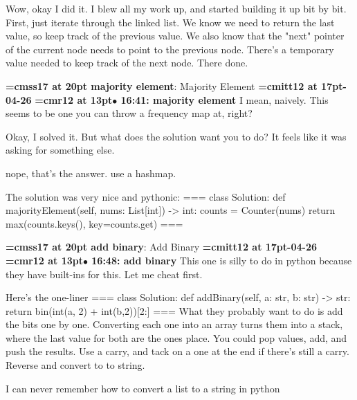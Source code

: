 Wow, okay I did it. I blew all my work up, and started building it up bit by bit. First, just iterate through the linked list. We know we need to return the last value, so keep track of the previous value. We also know that the "next" pointer of the current node needs to point to the previous node. There's a temporary value needed to keep track of the next node. There done.
\par

{\medskip\noindent\bf\font\titlefont=cmss17 at 20pt majority element}: Majority Element
{\medskip\noindent\bf\font\titlefont=cmitt12 at 17pt-04-26}\medskip
{\smallskip\noindent\bf\font\titlefont=cmr12 at 13pt\titlefont $\bullet$ 16:41: majority element}\smallskip
I mean, naively. This seems to be one you can throw a frequency map at, right?
\par

Okay, I solved it. But what does the solution want you to do? It feels like it was asking for something else.
\par

nope, that's the answer. use a hashmap.
\par

The solution was very nice and pythonic: === class Solution:     def majorityElement(self, nums: List[int]) -> int:         counts = Counter(nums)         return max(counts.keys(), key=counts.get) ===
\par

{\medskip\noindent\bf\font\titlefont=cmss17 at 20pt add binary}: Add Binary
{\medskip\noindent\bf\font\titlefont=cmitt12 at 17pt-04-26}\medskip
{\smallskip\noindent\bf\font\titlefont=cmr12 at 13pt\titlefont $\bullet$ 16:48: add binary}\smallskip
This one is silly to do in python because they have built-ins for this. Let me cheat first.
\par

Here's the one-liner === class Solution:     def addBinary(self, a: str, b: str) -> str:         return bin(int(a, 2) + int(b,2))[2:] === What they probably want to do is add the bits one by one. Converting each one into an array turns them into a stack, where the last value for both are the ones place. You could pop values, add, and push the results. Use a carry, and tack on a one at the end if there's still a carry. Reverse and convert to to string.
\par

I can never remember how to convert a list to a string in python
\par

